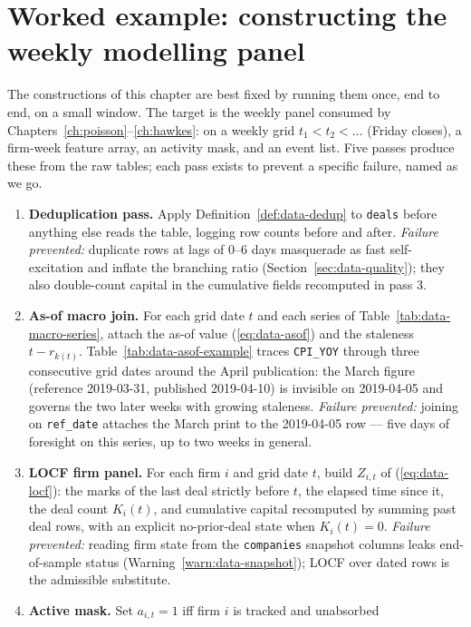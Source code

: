 \section{Worked example: constructing the weekly modelling panel}
\label{sec:data-worked}

The constructions of this chapter are best fixed by running them once, end to end, on
a small window. The target is the weekly panel consumed by
Chapters~\ref{ch:poisson}--\ref{ch:hawkes}: on a weekly grid $t_1 < t_2 < \dots$
(Friday closes), a firm-week feature array, an activity mask, and an event list. Five
passes produce these from the raw tables; each pass exists to prevent a specific
failure, named as we go.

\begin{enumerate}
\item \textbf{Deduplication pass.} Apply Definition~\ref{def:data-dedup} to
\texttt{deals} before anything else reads the table, logging row counts before and
after. \emph{Failure prevented:} duplicate rows at lags of 0--6 days masquerade as
fast self-excitation and inflate the branching ratio
(Section~\ref{sec:data-quality}); they also double-count capital in the cumulative
fields recomputed in pass 3.
\item \textbf{As-of macro join.} For each grid date $t$ and each series of
Table~\ref{tab:data-macro-series}, attach the as-of value (\ref{eq:data-asof}) and
the staleness $t - r_{k(t)}$. Table~\ref{tab:data-asof-example} traces
\texttt{CPI\_YOY} through three consecutive grid dates around the April publication:
the March figure (reference 2019-03-31, published 2019-04-10) is invisible on
2019-04-05 and governs the two later weeks with growing staleness.
\emph{Failure prevented:} joining on \texttt{ref\_date} attaches the March print to
the 2019-04-05 row --- five days of foresight on this series, up to two weeks in
general.
\item \textbf{LOCF firm panel.} For each firm $i$ and grid date $t$, build $Z_{i,t}$
of (\ref{eq:data-locf}): the marks of the last deal strictly before $t$, the elapsed
time since it, the deal count $K_i(t)$, and cumulative capital recomputed by summing
past deal rows, with an explicit no-prior-deal state when $K_i(t) = 0$.
\emph{Failure prevented:} reading firm state from the \texttt{companies} snapshot
columns leaks end-of-sample status (Warning~\ref{warn:data-snapshot}); LOCF over
dated rows is the admissible substitute.
\item \textbf{Active mask.} Set $a_{i,t} = 1$ iff firm $i$ is tracked and unabsorbed

\end{enumerate}

